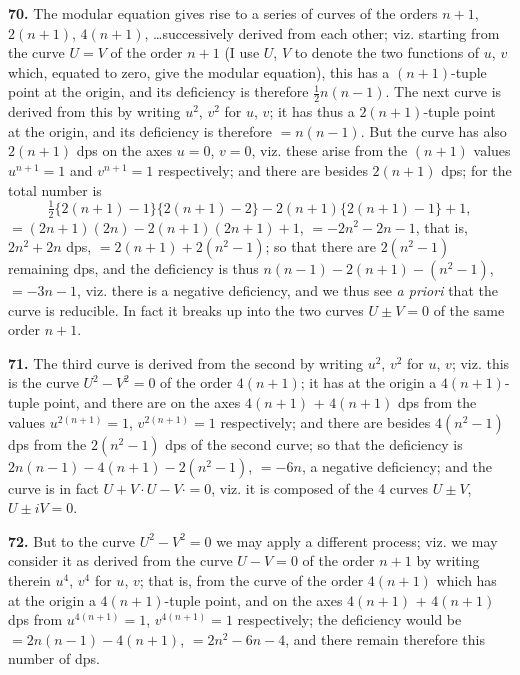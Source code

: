 \documentclass[12pt,a4paper]{article}
\begin{document}
\textbf{70.} The modular equation gives rise to a series of curves of the orders $n + 1$, $2(n + 1)$, $4(n + 1)$, \ldots successively derived from each other; viz. starting from the curve $U = V$ of the order $n + 1$ (I use $U$, $V$ to denote the two functions of $u$, $v$ which, equated to zero, give the modular equation), this has a $(n + 1)$-tuple point at the origin, and its deficiency is therefore $\frac{1}{2}n(n - 1)$. The next curve is derived from this by writing $u^2$, $v^2$ for $u$, $v$; it has thus a $2(n + 1)$-tuple point at the origin, and its deficiency is therefore $= n(n - 1)$. But the curve has also $2(n + 1)$ dps on the axes $u = 0$, $v = 0$, viz. these arise from the $(n + 1)$ values $u^{n+1} = 1$ and $v^{n+1} = 1$ respectively; and there are besides $2(n + 1)$ dps; for the total number is
\[
\tfrac{1}{2}\{2(n+1) - 1\}\{2(n+1) - 2\} - 2(n+1)\{2(n+1) - 1\} + 1,
\]
$= (2n + 1)(2n) - 2(n + 1)(2n + 1) + 1$, $= -2n^2 - 2n - 1$, that is, $2n^2 + 2n$ dps, $= 2(n + 1) + 2(n^2 - 1)$; so that there are $2(n^2 - 1)$ remaining dps, and the deficiency is thus $n(n - 1) - 2(n + 1) - (n^2 - 1)$, $= -3n - 1$, viz. there is a negative deficiency, and we thus see \textit{a priori} that the curve is reducible. In fact it breaks up into the two curves $U \pm V = 0$ of the same order $n + 1$.

\textbf{71.} The third curve is derived from the second by writing $u^2$, $v^2$ for $u$, $v$; viz. this is the curve $U^2 - V^2 = 0$ of the order $4(n + 1)$; it has at the origin a $4(n + 1)$-tuple point, and there are on the axes $4(n + 1)$ + $4(n + 1)$ dps from the values $u^{2(n+1)} = 1$, $v^{2(n+1)} = 1$ respectively; and there are besides $4(n^2 - 1)$ dps from the $2(n^2 - 1)$ dps of the second curve; so that the deficiency is $2n(n - 1) - 4(n + 1) - 2(n^2 - 1)$, $= -6n$, a negative deficiency; and the curve is in fact $U + V \cdot U - V \cdot = 0$, viz. it is composed of the 4 curves $U \pm V$, $U \pm iV = 0$.

\textbf{72.} But to the curve $U^2 - V^2 = 0$ we may apply a different process; viz. we may consider it as derived from the curve $U - V = 0$ of the order $n + 1$ by writing therein $u^4$, $v^4$ for $u$, $v$; that is, from the curve of the order $4(n + 1)$ which has at the origin a $4(n + 1)$-tuple point, and on the axes $4(n + 1)$ + $4(n + 1)$ dps from $u^{4(n+1)} = 1$, $v^{4(n+1)} = 1$ respectively; the deficiency would be $= 2n(n - 1) - 4(n + 1)$, $= 2n^2 - 6n - 4$, and there remain therefore this number of dps.
\end{document}
